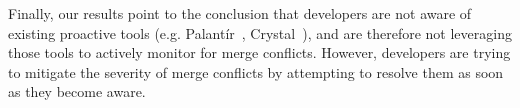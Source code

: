 Finally, our results point to the conclusion that developers are not aware of existing proactive tools (e.g. Palant\'{i}r~\cite{sarma_palantir:_2003}, Crystal~\cite{Brun2011}), and are therefore not leveraging those tools to actively monitor for merge conflicts.
However, developers are trying to mitigate the severity of merge conflicts by attempting to resolve them as soon as they become aware.
